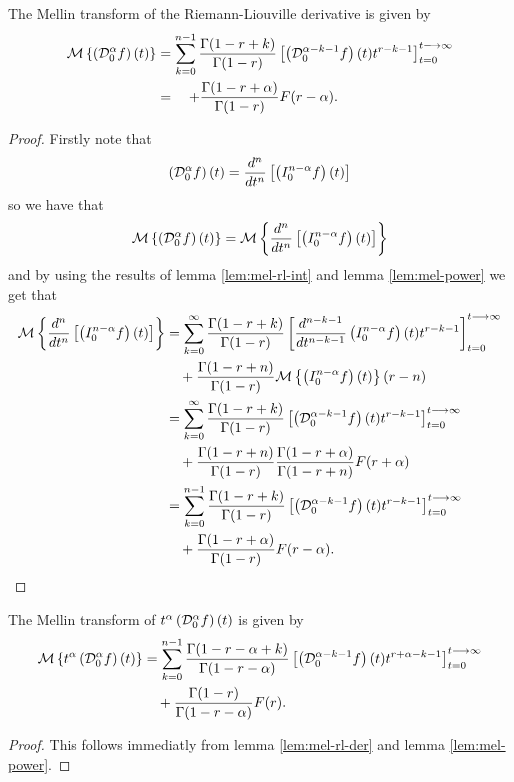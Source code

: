 \documentclass{unswmaths}
\begin{document}
\begin{lemma}
\label{lem:mel-rl-der}
	The Mellin transform of the Riemann-Liouville derivative is given by
	\begin{align*}
		\mathcal{M} \left\{ \left( \mathcal{D}_{0}^{\alpha} f \right)(t) \right\} &= \sum_{k=0}^{n-1} \frac{\Gamma(1-r+k)}{\Gamma(1-r)} 
			\left[ \left( \mathcal{D}_{0}^{\alpha-k-1} f \right)(t)t^{r-k-1} \right]_{t=0}^{t \longrightarrow \infty} \\
			&= \ \ \ + \frac{\Gamma(1-r+\alpha)}{\Gamma(1-r)}F(r-\alpha).
	\end{align*}
\end{lemma}
\begin{proof}
	Firstly note that $$ \left( \mathcal{D}_{0}^{\alpha} f \right)(t) = \frac{d^n}{dt^n} \left[ \left( I_{0}^{n-\alpha} f \right)(t) \right] $$
	so we have that
	\begin{align*}
		\mathcal{M} \left\{ \left( \mathcal{D}_{0}^{\alpha} f \right)(t) \right\} &= \mathcal{M} \left\{ \frac{d^n}{dt^n} \left[ \left( I_{0}^{n-\alpha} f \right)(t) \right] \right\} \\
	\end{align*}
	and by using the results of lemma \ref{lem:mel-rl-int} and lemma \ref{lem:mel-power} we get that
	\begin{align*}
		\mathcal{M} \left\{ \frac{d^n}{dt^n} \left[ \left( I_{0}^{n-\alpha} f \right)(t) \right] \right\} 
			&= \sum_{k=0}^\infty \frac{\Gamma(1-r+k)}{\Gamma(1-r)} \left[ \frac{d^{n-k-1}}{dt^{n-k-1}} \left( I_{0}^{n-\alpha} f \right)(t)t^{r-k-1}\right]_{t=0}^{t \longrightarrow \infty} \\
			& \ \ \ + \frac{\Gamma(1-r+n)}{\Gamma(1-r)}\mathcal{M} \left\{ \left( I_{0}^{n-\alpha} f \right)(t) \right\}(r-n) \\
			&= \sum_{k=0}^\infty \frac{\Gamma(1-r+k)}{\Gamma(1-r)} \left[ \left( \mathcal{D}_{0}^{\alpha-k-1} f \right)(t)t^{r-k-1}\right]_{t=0}^{t \longrightarrow \infty} \\
			& \ \ \ + \frac{\Gamma(1-r+n)}{\Gamma(1-r)}\frac{\Gamma(1-r+\alpha)}{\Gamma(1-r+n)}F(r+\alpha)\\
			&= \sum_{k=0}^{n-1} \frac{\Gamma(1-r+k)}{\Gamma(1-r)} 
			\left[ \left( \mathcal{D}_{0}^{\alpha-k-1} f \right)(t)t^{r-k-1} \right]_{t=0}^{t \longrightarrow \infty} \\
			& \ \ \ + \frac{\Gamma(1-r+\alpha)}{\Gamma(1-r)}F(r-\alpha).
	\end{align*}
\end{proof}

\begin{lemma}
	The Mellin transform of $ t^\alpha \left( \mathcal{D}_{0}^{\alpha} f \right)(t) $ is given by
	\begin{align*}
		\mathcal{M} \left\{ t^\alpha \left( \mathcal{D}_{0}^{\alpha} f \right)(t) \right\} 
			&= \sum_{k=0}^{n-1}\frac{\Gamma(1-r-\alpha+k)}{\Gamma(1-r-\alpha)} \left[ \left( \mathcal{D}_{0}^{\alpha - k - 1} f \right)(t) t^{r+\alpha-k-1}\right]_{t=0}^{t\longrightarrow\infty} \\
			& \ \ \ + \frac{\Gamma(1-r)}{\Gamma(1-r-\alpha)}F(r).
	\end{align*}
\end{lemma}
\begin{proof}
	This follows immediatly from lemma \ref{lem:mel-rl-der} and lemma \ref{lem:mel-power}.
\end{proof}
\end{document}
